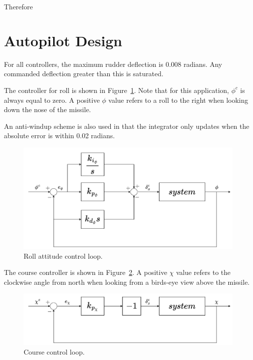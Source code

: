 \documentclass{article}
\newcommand{\abf}{\mathbf{a}}
\begin{document}
Therefore
%						
% 	

\section{Autopilot Design}

For all controllers, the maximum rudder deflection is 0.008 radians. Any commanded deflection greater than this is saturated.

The controller for roll is shown in Figure~\ref{fig:roll_control}. Note that for this application, $\phi^c$ is always equal to zero. A positive $\phi$ value refers to a roll to the right when looking down the nose of the missile. 

An anti-windup scheme is also used in that the integrator only updates when the absolute error is within 0.02 radians.

\begin{figure}[h!]
\centering
    \includegraphics[width=1.0\linewidth]{./figures/roll_controller.drawio.png}
    \caption{Roll attitude control loop.}
    \label{fig:roll_control}
\end{figure} 

\FloatBarrier

The course controller is shown in Figure~\ref{fig:yaw_control}. A positive $\chi$ value refers to the clockwise angle from north when looking from a birds-eye view above the missile.

\begin{figure}[h!]
    \includegraphics[width=1.0\linewidth]{./figures/course_controller.drawio.png}
    \caption{Course control loop.}
    \label{fig:yaw_control}
\end{figure} 
\end{document}
